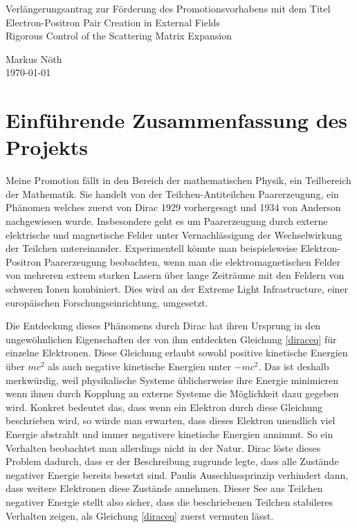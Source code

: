 \documentclass[a4paper,12pt]{article}
\begin{document}
\begin{center}
{\huge Verlängerungsantrag zur Förderung des Promotionsvorhabens mit dem Titel
\\
{\Large Electron-Positron Pair Creation in External Fields \\
Rigorous Control of the Scattering Matrix Expansion}}
\end{center}

\begin{center}
Markus Nöth
\\ \today
\end{center}

\section{Einführende Zusammenfassung des Projekts}
Meine Promotion fällt in den Bereich der mathematischen Physik, ein Teilbereich der Mathematik. Sie handelt von der 
Teilchen-Antiteilchen Paarerzeugung, ein Phänomen welches zuerst von Dirac 1929 vorhergesagt und 1934 von 
Anderson nachgewiesen wurde. Insbesondere geht es um Paarerzeugung durch externe elektrische und 
magnetische Felder unter Vernachlässigung der Wechselwirkung der Teilchen untereinander. Experimentell könnte
man beispielsweise Elektron-Positron Paarerzeugung beobachten, wenn man die elektromagnetischen Felder von
mehreren extrem starken Lasern über lange Zeiträume mit den Feldern von schweren Ionen kombiniert. 
Dies wird an der Extreme Light Infrastructure, einer europäischen Forschungseinrichtung, umgesetzt. 

Die Entdeckung dieses Phänomens durch Dirac hat ihren Ursprung in den ungewöhnlichen Eigenschaften der von ihm
entdeckten Gleichung \eqref{diraceq} für einzelne Elektronen.
Diese Gleichung erlaubt sowohl positive kinetische 
Energien über \(m c^2\) als auch negative kinetische Energien unter \(-mc^2\). Das ist deshalb merkwürdig, weil
physikalische Systeme üblicherweise ihre Energie minimieren wenn ihnen durch Kopplung an externe Systeme
die Möglichkeit dazu gegeben wird. Konkret bedeutet das, dass wenn ein Elektron durch diese Gleichung beschrieben
wird, so würde man erwarten,
dass dieses Elektron unendlich viel Energie abstrahlt und immer negativere kinetische Energien annimmt. So ein Verhalten
beobachtet man allerdings nicht in der Natur. Dirac löste dieses Problem dadurch, dass er 
der Beschreibung zugrunde legte, dass alle Zustände negativer Energie bereits besetzt sind. Paulis Ausschlussprinzip 
verhindert dann, dass weitere Elektronen diese Zustände annehmen. Dieser See aus Teilchen negativer Energie stellt
also sicher, dass die beschriebenen Teilchen stabileres Verhalten zeigen, als Gleichung \eqref{diraceq} zuerst vermuten lässt.
\end{document}

